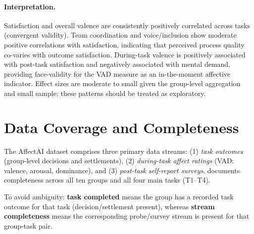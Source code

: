 \documentclass[11pt,a4paper]{article}
\begin{document}
\paragraph{Interpretation.}
Satisfaction and overall valence are consistently positively correlated across
tasks (convergent validity).
Team coordination and voice/inclusion show moderate positive correlations with
satisfaction, indicating that perceived process quality co-varies with outcome
satisfaction.
During-task valence is positively associated with post-task satisfaction and
negatively associated with mental demand, providing face-validity for the VAD
measure as an in-the-moment affective indicator.
Effect sizes are moderate to small given the group-level aggregation and small
sample; these patterns should be treated as exploratory.

\section{Data Coverage and Completeness}
\label{sec:coverage}

The AffectAI dataset comprises three primary data streams: (1) \textit{task outcomes}
(group-level decisions and settlements), (2) \textit{during-task affect ratings} (VAD:
valence, arousal, dominance), and (3) \textit{post-task self-report surveys}.
 documents completeness across all ten groups and all four main tasks
(T1–T4).

To avoid ambiguity: \textbf{task completed} means the group has a recorded
task outcome for that task (decision/settlement present), whereas
\textbf{stream completeness} means the corresponding probe/survey stream is present
for that group-task pair.
\end{document}
